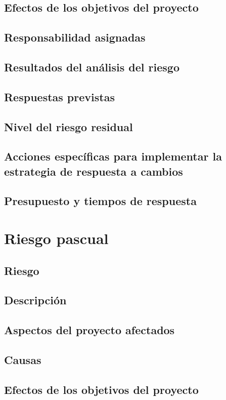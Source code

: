 \documentclass[11pt,a4paper,spanish,twoside]{report}
\begin{document}
\subsection{Efectos de los objetivos del proyecto}
\subsection{Responsabilidad asignadas}
\subsection{Resultados del análisis del riesgo}
\subsection{Respuestas previstas}
\subsection{Nivel del riesgo residual}
\subsection{Acciones específicas para implementar la estrategia de respuesta
a cambios}
\subsection{Presupuesto y tiempos de respuesta}

\section{Riesgo pascual}
\subsection{Riesgo}
\subsection{Descripción}
\subsection{Aspectos del proyecto afectados}
\subsection{Causas}
\subsection{Efectos de los objetivos del proyecto}
\end{document}
